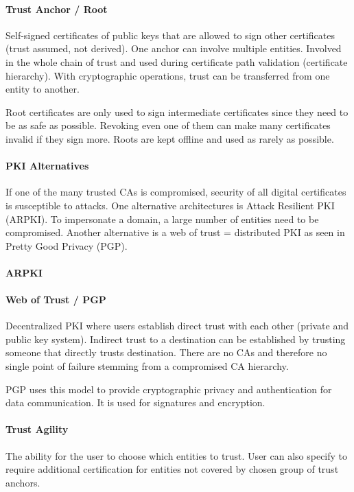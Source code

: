 
\paragraph{Trust Anchor / Root}
Self-signed certificates of public keys that are allowed to sign other certificates (trust assumed, not derived). One anchor can involve multiple entities. Involved in the whole chain of trust and used during certificate path validation (certificate hierarchy). With cryptographic operations, trust can be transferred from one entity to another.

Root certificates are only used to sign intermediate certificates since they need to be as safe as possible. Revoking even one of them can make many certificates invalid if they sign more. Roots are kept offline and used as rarely as possible.

\paragraph{PKI Alternatives}
If one of the many trusted CAs is compromised, security of all digital certificates is susceptible to attacks. One alternative architectures is Attack Resilient PKI (ARPKI). To impersonate a domain, a large number of entities need to be compromised. Another alternative is a web of trust = distributed PKI as seen in Pretty Good Privacy (PGP).

\paragraph{ARPKI}

\paragraph{Web of Trust / PGP}
Decentralized PKI where users establish direct trust with each other (private and public key system). Indirect trust to a destination can be established by trusting someone that directly trusts destination. There are no CAs and therefore no single point of failure stemming from a compromised CA hierarchy.

PGP uses this model to provide cryptographic privacy and authentication for data communication. It is used for signatures and encryption.

\paragraph{Trust Agility}
The ability for the user to choose which entities to trust. User can also specify to require additional certification for entities not covered by chosen group of trust anchors.

